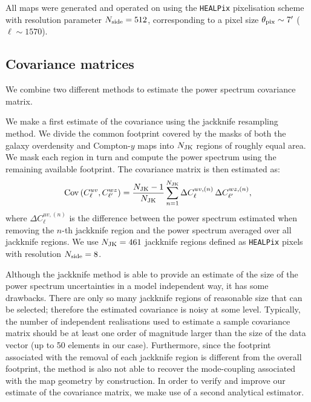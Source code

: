 \documentclass[useAMS,usenatbib]{mn2e}
\begin{document}
    All maps were generated and operated on using the {\tt HEALPix} pixelisation scheme \citep{2005ApJ...622..759G} with resolution parameter $N_{\rm side}=512$, corresponding to a pixel size $\theta_{\rm pix}\sim7'$ ($\ell \sim 1570$).

  \subsection{Covariance matrices}\label{ssec:methods.cov}
    We combine two different methods to estimate the power spectrum covariance matrix. 
    
    We make a first estimate of the covariance using the jackknife resampling method. We divide the common footprint covered by the masks of both the galaxy overdensity and Compton-$y$ maps into $N_{\rm JK}$ regions of roughly equal area. We mask each region in turn and compute the power spectrum  using the remaining available footprint. The covariance matrix is then estimated as:
    \begin{equation}\label{eq:cov_jk}
      {\rm Cov}\left(C^{uv}_\ell,C^{wz}_{\ell'}\right)=\frac{N_{\rm JK}-1}{N_{\rm JK}}\sum_{n=1}^{N_{\rm JK}}\Delta C^{uv,(n)}_\ell\,\Delta C^{wz,(n)}_{\ell'},
    \end{equation}
    where $\Delta C^{uv,(n)}_\ell$ is the difference between the power spectrum estimated when removing the $n$-th jackknife region and the power spectrum averaged over all jackknife regions. We use $N_{\rm JK}=461$ jackknife regions defined as {\tt HEALPix} pixels with resolution $N_{\rm side}=8$.

    Although the jackknife method is able to provide an estimate of the size of the power spectrum uncertainties in a model independent way, it has some drawbacks. There are only so many jackknife regions of reasonable size that can be selected; therefore the estimated covariance is noisy at some level. Typically, the number of independent realisations used to estimate a sample covariance matrix should be at least one order of magnitude larger than the size of the data vector (up to 50 elements in our case). Furthermore, since the footprint associated with the removal of each jackknife region is different from the overall footprint, the method is also not able to recover the mode-coupling associated with the map geometry by construction. In order to verify and improve our estimate of the covariance matrix, we make use of a second analytical estimator.
\end{document}
